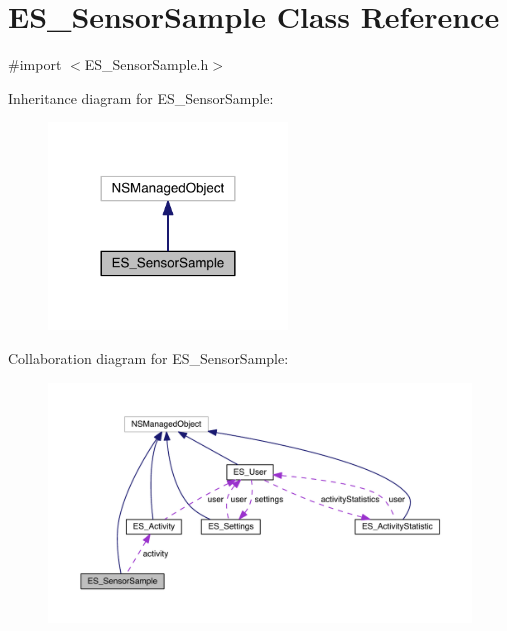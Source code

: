 \hypertarget{interface_e_s___sensor_sample}{\section{E\+S\+\_\+\+Sensor\+Sample Class Reference}
\label{interface_e_s___sensor_sample}
}


{\ttfamily \#import $<$E\+S\+\_\+\+Sensor\+Sample.\+h$>$}



Inheritance diagram for E\+S\+\_\+\+Sensor\+Sample\+:\nopagebreak
\begin{figure}[H]
\begin{center}
\leavevmode
\includegraphics[width=180pt]{db/d4f/interface_e_s___sensor_sample__inherit__graph}
\end{center}
\end{figure}


Collaboration diagram for E\+S\+\_\+\+Sensor\+Sample\+:\nopagebreak
\begin{figure}[H]
\begin{center}
\leavevmode
\includegraphics[width=350pt]{d1/d5e/interface_e_s___sensor_sample__coll__graph}
\end{center}
\end{figure}
